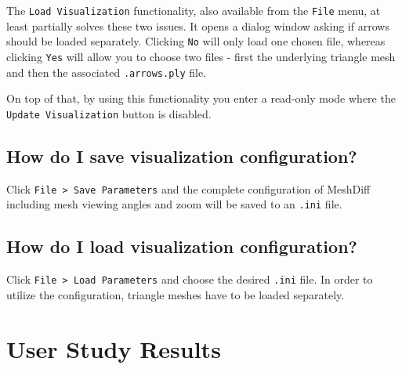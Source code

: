 The \verb+Load Visualization+ functionality, also available from the \verb+File+ menu, at least partially solves these two issues. It opens a dialog window asking if arrows should be loaded separately. Clicking \verb+No+ will only load one chosen file, whereas clicking \verb+Yes+ will allow you to choose two files - first the underlying triangle mesh and then the associated \verb+.arrows.ply+ file.

On top of that, by using this functionality you enter a read-only mode where the \verb+Update Visualization+ button is disabled.

\subsection{How do I save visualization configuration?}

Click \verb+File > Save Parameters+ and the complete configuration of MeshDiff including mesh viewing angles and zoom will be saved to an \verb+.ini+ file.

\subsection{How do I load visualization configuration?}

Click \verb+File > Load Parameters+ and choose the desired \verb+.ini+ file. In order to utilize the configuration, triangle meshes have to be loaded separately.

\section{User Study Results}

